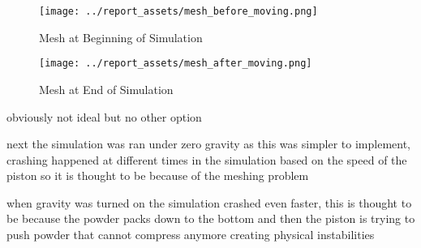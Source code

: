 \begin{figure}[htbp]
    \centering

    \begin{minipage}{0.45\textwidth}
        \centering
        \texttt{[image: ../report\_assets/mesh\_before\_moving.png]}
        \caption{Mesh at Beginning of Simulation}\label{fig:2D-tank}
    \end{minipage}
    \hfill
    \begin{minipage}{0.45\textwidth}
        \centering
        \texttt{[image: ../report\_assets/mesh\_after\_moving.png]}
        \caption{Mesh at End of Simulation}\label{fig:mesh-tank}
    \end{minipage}

\end{figure}
obviously not ideal but no other option

next the simulation was ran under zero gravity as this was simpler to implement, crashing happened at different times in the simulation based on the speed of the piston so it is thought to be because of the meshing problem

when gravity was turned on the simulation crashed even faster, this is thought to be because the powder packs down to the bottom and then the piston is trying to push powder that cannot compress anymore creating physical instabilities

















